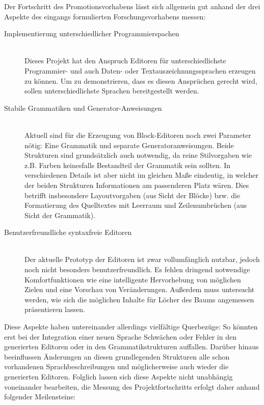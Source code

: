 \documentclass[paper=a4,fontsize=12pt,parskip=half]{scrartcl}
\begin{document}
Der Fortschritt des Promotionsvorhabens lässt sich allgemein gut anhand der drei Aspekte des eingangs formulierten Forschungsvorhabens messen:

\begin{description}
\item[Implementierung unterschiedlicher Programmierspachen] \hfill\\
  Dieses Projekt hat den Anspruch Editoren für unterschiedlichste Programmier- und auch Daten- oder Textauszeichnungssprachen erzeugen zu können. Um zu demonstrieren, dass es diesen Ansprüchen gerecht wird, sollen unterschiedlichste Sprachen bereitgestellt werden.

\item[Stabile Grammatiken und Generator-Anweisungen] \hfill\\
  Aktuell sind für die Erzeugung von Block-Editoren noch zwei Parameter nötig: Eine Grammatik und separate Generatoranweisungen. Beide Strukturen sind grundsätzlich auch notwendig, da reine Stilvorgaben wie z.B. Farben keinesfalls Bestandteil der Grammatik sein sollten. In verschiedenen Details ist aber nicht im gleichen Maße eindeutig, in welcher der beiden Strukturen Informationen am passenderen Platz wären. Dies betrifft insbesondere Layoutvorgaben (aus Sicht der Blöcke) bzw. die Formatierung des Quelltextes mit Leerraum und Zeilenumbrüchen (aus Sicht der Grammatik).

\item[Benutzerfreundliche syntaxfreie Editoren] \hfill\\
  Der aktuelle Prototyp der Editoren ist zwar vollumfänglich nutzbar, jedoch noch nicht besonders benutzerfreundlich. Es fehlen dringend notwendige Komfortfunktionen wie eine intelligente Hervorhebung von möglichen Zielen und eine Vorschau von Veränderungen. Außerdem muss untersucht werden, wie sich die möglichen Inhalte für Löcher des Baums angemessen präsentieren lassen.
\end{description}

Diese Aspekte haben untereinander allerdings vielfältige Querbezüge: So könnten erst bei der Integration einer neuen Sprache Schwächen oder Fehler in den generierten Editoren oder in den Grammatikstrukturen auffallen. Darüber hinaus beeinflussen Änderungen an diesen grundlegenden Strukturen alle schon vorhandenen Sprachbeschreibungen und möglicherweise auch wieder die generierten Editoren. Folglich lassen sich diese Aspekte nicht unabhängig voneinander bearbeiten, die Messung des Projektfortschritts erfolgt daher anhand folgender Meilensteine:
\end{document}
